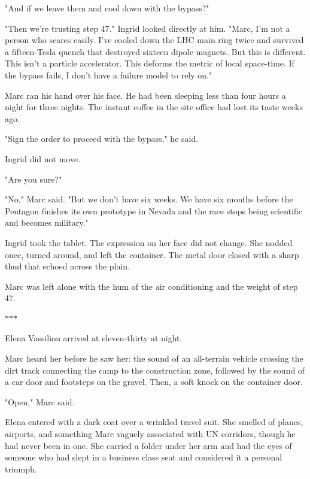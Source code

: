 \documentclass[11pt,a5paper,twoside]{book}
\begin{document}
"And if we leave them and cool down with the bypass?"

"Then we're trusting step 47." Ingrid looked directly at him. "Marc, I'm not a person who scares easily. I've cooled down the LHC main ring twice and survived a fifteen-Tesla quench that destroyed sixteen dipole magnets. But this is different. This isn't a particle accelerator. This deforms the metric of local space-time. If the bypass fails, I don't have a failure model to rely on."

Marc ran his hand over his face. He had been sleeping less than four hours a night for three nights. The instant coffee in the site office had lost its taste weeks ago.

"Sign the order to proceed with the bypass," he said.

Ingrid did not move.

"Are you sure?"

"No," Marc said. "But we don't have six weeks. We have six months before the Pentagon finishes its own prototype in Nevada and the race stops being scientific and becomes military."

Ingrid took the tablet. The expression on her face did not change. She nodded once, turned around, and left the container. The metal door closed with a sharp thud that echoed across the plain.

Marc was left alone with the hum of the air conditioning and the weight of step 47.

\vspace{1.5em}
\begin{center}$\ast$\quad$\ast$\quad$\ast$\end{center}
\vspace{1.5em}

Elena Vassiliou arrived at eleven-thirty at night.

Marc heard her before he saw her: the sound of an all-terrain vehicle crossing the dirt track connecting the camp to the construction zone, followed by the sound of a car door and footsteps on the gravel. Then, a soft knock on the container door.

"Open," Marc said.

Elena entered with a dark coat over a wrinkled travel suit. She smelled of planes, airports, and something Marc vaguely associated with UN corridors, though he had never been in one. She carried a folder under her arm and had the eyes of someone who had slept in a business class seat and considered it a personal triumph.
\end{document}
